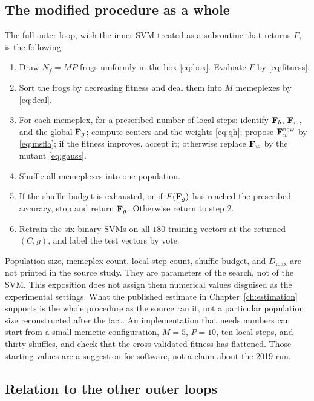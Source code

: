 \subsection{The modified procedure as a whole}

The full outer loop, with the inner SVM treated as a subroutine that returns \(F\), is the following.
\begin{enumerate}
\item Draw \(N_{f}=M P\) frogs uniformly in the box \eqref{eq:box}.
Evaluate \(F\) by \eqref{eq:fitness}.
\item Sort the frogs by decreasing fitness and deal them into \(M\) memeplexes by \eqref{eq:deal}.
\item For each memeplex, for a prescribed number of local steps: identify \(\mathbf{F}_{b}\), \(\mathbf{F}_{w}\), and the global \(\mathbf{F}_{g}\); compute centers and the weights \eqref{eq:qh}; propose \(\mathbf{F}_{w}^{\mathrm{new}}\) by \eqref{eq:msfla}; if the fitness improves, accept it; otherwise replace \(\mathbf{F}_{w}\) by the mutant \eqref{eq:gauss}.
\item Shuffle all memeplexes into one population.
\item If the shuffle budget is exhausted, or if \(F(\mathbf{F}_{g})\) has reached the prescribed accuracy, stop and return \(\mathbf{F}_{g}\).
Otherwise return to step 2.
\item Retrain the six binary SVMs on all \(180\) training vectors at the returned \((C, g)\), and label the test vectors by vote.
\end{enumerate}
Population size, memeplex count, local-step count, shuffle budget, and \(D_{\max}\) are not printed in the source study.
They are parameters of the search, not of the SVM.
This exposition does not assign them numerical values disguised as the experimental settings.
What the published estimate in Chapter~\ref{ch:estimation} supports is the whole procedure as the source ran it, not a particular population size reconstructed after the fact.
An implementation that needs numbers can start from a small memetic configuration, \(M=5\), \(P=10\), ten local steps, and thirty shuffles, and check that the cross-validated fitness has flattened.
Those starting values are a suggestion for software, not a claim about the 2019 run.

\subsection{Relation to the other outer loops}

